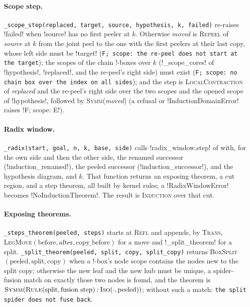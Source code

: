 \paragraph{Scope step.} \texttt{\_\allowbreak{}scope\_\allowbreak{}step(\allowbreak{}replaced,\allowbreak{} target,\allowbreak{} source,\allowbreak{} hypothesis,\allowbreak{} k,\allowbreak{} failed)} re-raises \code!failed! when \code!source! has no first peeler at $k$. Otherwise \textit{moved} is \textsc{Repeel} of \textit{source} at $k$ from the joint peel to the one with the first peelers at their last copy, whose left side must be \code!target! (\texttt{F; scope: the re-peel does not start at the target}); the scopes of the chain !-boxes over $k$ (\py!_scope_cores! of \code!hypothesis!, \code!replaced!, and the re-peel's right side) must exist (\texttt{F; scope: no chain box over the index on all sides}); and the step is \textsc{LocalContraction} of \textit{replaced} and the re-peel's right side over the two scopes and the opened scope of \code!hypothesis!, followed by \textsc{Symm}(\textit{moved}) (a refusal or \py!InductionDomainError! raises \code!F; scope: E!).

\paragraph{Radix window.} \texttt{\_\allowbreak{}radix(\allowbreak{}start,\allowbreak{} goal,\allowbreak{} n,\allowbreak{} k,\allowbreak{} base,\allowbreak{} side)} calls \py!radix_window.step! of  with, for the own side and then the other side, the renamed successor (\py!induction_renamed!), the peeled successor (\py!induction_successor!), and the hypothesis diagram, and $k$. That function returns an exposing theorem, a cut region, and a step theorem, all built by kernel rules; a \py!RadixWindowError! becomes \py!NoInductionTheorem!. The result is \textsc{Induction} over that cut.

\paragraph{Exposing theorems.} \texttt{\_\allowbreak{}steps\_\allowbreak{}theorem(\allowbreak{}peeled,\allowbreak{} steps)} starts at \textsc{Refl} and appends, by \textsc{Trans}, \textsc{LegMove}$(\text{before},\text{after},\text{copy\_before})$ for a move and \py!_split_theorem! for a split. \texttt{\_\allowbreak{}split\_\allowbreak{}theorem(\allowbreak{}peeled,\allowbreak{} split,\allowbreak{} copy,\allowbreak{} split\_\allowbreak{}copy)} returns \textsc{BoxSplit}$(\text{peeled},\text{split},\text{copy})$ when a !-box's node scope contains the nodes new to the split copy; otherwise the new leaf and the new hub must be unique, a spider-fusion match on exactly those two nodes is found, and the theorem is $\textsc{Symm}(\textsc{Rule}(\text{split}, \text{fusion step})\mathbin{;}\textsc{Iso}(\cdot,\text{peeled}))$; without such a match: \texttt{the split spider does not fuse back}.

